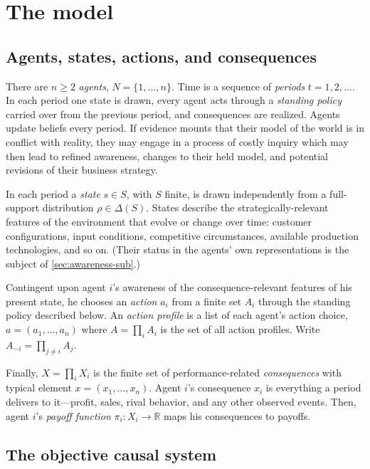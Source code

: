 \documentclass[11pt]{article}
\theoremstyle{definition}
\begin{document}
\section{The model}
\label{sec:model}

\subsection{Agents, states, actions, and consequences}
\label{sec:primitives}

There are $n\ge 2$ \textit{agents}, $N=\{1,\dots,n\}$.
Time is a sequence of \textit{periods} $t=1,2,\dots$.
In each period one state is drawn, every agent acts through a \emph{standing policy} carried over from the previous period, and consequences are realized.
Agents update beliefs every period.
If evidence mounts that their model of the world is in conflict with reality, they may engage in a process of costly inquiry which may then lead to refined awareness, changes to their held model, and potential revisions of their business strategy.


In each period a \textit{state} $s\in S$, with $S$ finite, is drawn independently from a full-support distribution $\rho\in\Delta(S)$.
States describe the strategically-relevant features of the environment that evolve or change over time: customer configurations, input conditions, competitive circumstances, available production technologies, and so on.
(Their status in the agents' own representations is the subject of \cref{sec:awareness-sub}.)

Contingent upon agent \(i\)'s awareness of the consequence-relevant features of his present state, he chooses an \textit{action} $a_i$ from a finite set $A_i$ through the standing policy described below.
An \textit{action profile} is a list of each agent's action choice, $a=(a_1,\ldots,a_n)$ where $A=\prod_iA_i$ is the set of all action profiles.
Write \(A_{-i}=\prod_{j\neq i}A_j\).

Finally, $X=\prod_iX_i$ is the finite set of performance-related \textit{consequences} with typical element $x=(x_1,\dots,x_n)$.
Agent $i$'s consequence $x_i$ is everything a period delivers to it---profit, sales, rival behavior, and any other observed events.
Then, agent \(i\)'s \textit{payoff function} $\pi_i:X_i\to\mathbb R$ maps his consequences to payoffs.



\subsection{The objective causal system}
\label{sec:mechanisms-sub}
\end{document}
